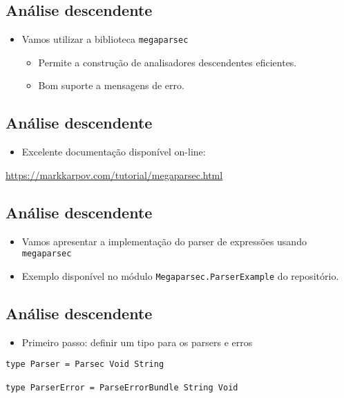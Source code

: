 \documentclass[11pt]{article}
\begin{document}
\subsection*{Análise descendente}
\label{sec:org245683c}

\begin{itemize}
\item Vamos utilizar a biblioteca \texttt{megaparsec}
\begin{itemize}
\item Permite a construção de analisadores descendentes eficientes.
\item Bom suporte a mensagens de erro.
\end{itemize}
\end{itemize}
\subsection*{Análise descendente}
\label{sec:org782ed52}

\begin{itemize}
\item Excelente documentação disponível on-line:
\end{itemize}

\url{https://markkarpov.com/tutorial/megaparsec.html}
\subsection*{Análise descendente}
\label{sec:orgeb89e10}

\begin{itemize}
\item Vamos apresentar a implementação do parser de expressões usando \texttt{megaparsec}

\item Exemplo disponível no módulo \texttt{Megaparsec.ParserExample} do repositório.
\end{itemize}
\subsection*{Análise descendente}
\label{sec:org5035ef2}

\begin{itemize}
\item Primeiro passo: definir um tipo para os parsers e erros
\end{itemize}

\begin{verbatim}
type Parser = Parsec Void String

type ParserError = ParseErrorBundle String Void
\end{verbatim}
\end{document}
